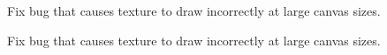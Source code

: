 
\begin{DoxyRefList}
\item[\label{todo__todo000001}%
\hypertarget{todo__todo000001}{}%
Member \hyperlink{class_screen_repaint_a49e16becb8912de9898f6fd423289093}{Screen\-Repaint\-:\-:init\-Frame\-Buffer\-Objects} ()]Fix bug that causes texture to draw incorrectly at large canvas sizes.

Fix bug that causes texture to draw incorrectly at large canvas sizes.
\end{DoxyRefList}